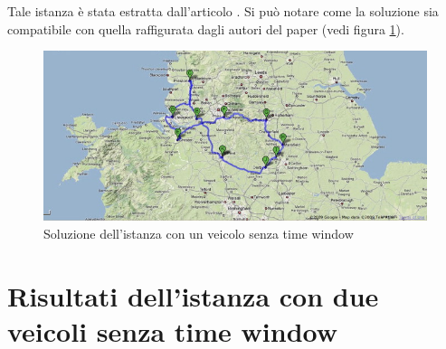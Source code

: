 		Tale istanza è stata estratta dall’articolo \cite{Laporte11}. Si può notare come la soluzione sia compatibile con quella raffigurata dagli autori del paper (vedi figura \ref{fig:map_laporte}). 

		\begin{figure}[H]
			\centering
			\includegraphics[keepaspectratio=true]{img/map_solution_laporte.jpg}
			\caption{Soluzione dell'istanza con un veicolo senza time window}
			\label{fig:map_laporte}
		\end{figure}


		
	\section{Risultati dell’istanza con due veicoli senza time window}
	\label{sec:istanza_due_veicoli_no_time_window}

